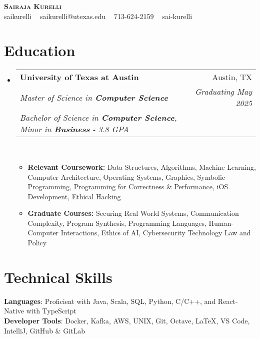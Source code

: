 \documentclass[letterpaper,11pt]{article}
\makeatletter
\newcommand{\resumeItem}[1]{
  \item\small{
    {#1 \vspace{-2pt}}
  }
}
\newcommand{\resumeSubLineheading}[5]{
  \vspace{-2pt}\item
    \begin{tabular*}{0.97\textwidth}[t]{l@{\extracolsep{\fill}}r}
      \textbf{#1} & #2 \\
      \textit{\small#3} & \textit{\small #5} \\
      \textit{\small#4}
    \end{tabular*}\vspace{-7pt}
}
\newcommand{\resumeSubHeadingListStart}{\begin{itemize}[leftmargin=0.15in, label={}]}
\newcommand{\resumeSubHeadingListEnd}{\end{itemize}}
\newcommand{\resumeItemListStart}{\begin{itemize}}
\newcommand{\resumeItemListEnd}{\end{itemize}\vspace{-5pt}}
\makeatother
\begin{document}

\begin{center}
    \textbf{\huge \scshape Sairaja Kurelli} \\ \vspace{3pt}
    \small \faGithub{} saikurelli $\;\;$ \faEnvelope{} saikurelli@utexas.edu $\;\;$ \faPhone{} 713-624-2159 $\;\;$\faLinkedin{} sai-kurelli
\end{center}


\section{Education}
  \resumeSubHeadingListStart
    \resumeSubLineheading
      {University of Texas at Austin}{Austin, TX}
      {Master of Science in \textbf{Computer Science}}
      {Bachelor of Science in \textbf{Computer Science}, Minor in \textbf{Business} - 3.8 GPA}{Graduating May 2025}
      \\
      \resumeItemListStart
        \resumeItem{\small \textbf{Relevant Coursework:} Data Structures, Algorithms, Machine Learning,
        Computer Architecture, Operating Systems, Graphics, Symbolic Programming, Programming for Correctness \& Performance,
        iOS Development, Ethical Hacking}
        \resumeItem{\small \textbf{Graduate Courses:} Securing Real World Systems, Communication Complexity, Program Synthesis, Programming Languages, Human-Computer Interactions, Ethics of AI, Cybersecurity Technology Law and Policy}
      \resumeItemListEnd
  \resumeSubHeadingListEnd


\section{Technical Skills}
\begin{itemize}[leftmargin=0.15in, label={}]
    \normalsize{\item{
    \textbf{Languages}{: Proficient with Java, Scala, SQL, Python, C/C++, and React-Native with TypeScript} \\
    \textbf{Developer Tools}{: Docker, Kafka, AWS, UNIX, Git, Octave, LaTeX, VS Code, IntelliJ, GitHub \& GitLab} \\
    }}
\end{itemize}
\end{document}
